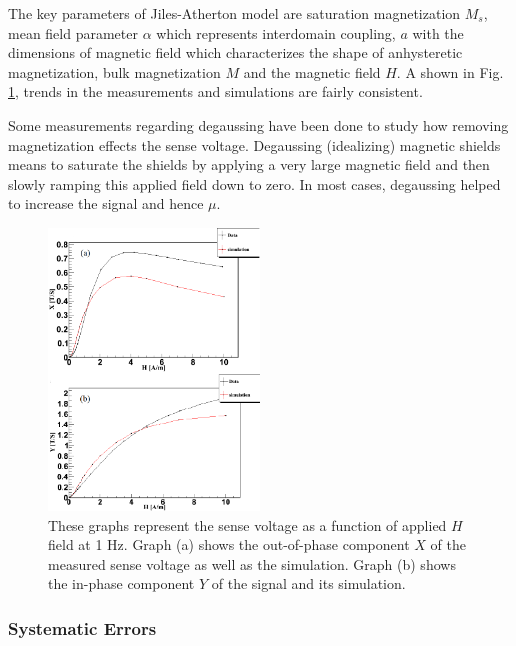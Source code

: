\documentclass[review]{elsarticle}
\begin{document}
The key parameters of Jiles-Atherton model are saturation
magnetization $M_s$, mean field parameter $\alpha$ which represents
interdomain coupling, $a$ with the dimensions of magnetic field which
characterizes the shape of anhysteretic magnetization, bulk
magnetization $M$ and the magnetic field $H$. A shown in
Fig. \ref{fig:data_and_simulation}, trends in the measurements and
simulations are fairly consistent.

Some measurements regarding degaussing have been done to study how
removing magnetization effects the sense voltage. Degaussing
(idealizing) magnetic shields means to saturate the shields by
applying a very large magnetic field and then slowly ramping this
applied field down to zero. In most cases, degaussing helped to
increase the signal and hence $\mu$.

\begin{figure}[h!]
\begin{center}
   \includegraphics[width=0.5\textwidth]{data_and_simulation3.PNG}
    \caption{These graphs represent the sense voltage as a function of applied $H$ field at 1 Hz. Graph (a) shows the out-of-phase component $X$ of the measured sense voltage as well as the simulation. Graph (b) shows the in-phase component $Y$ of the signal and its simulation.}
    \label{fig:data_and_simulation}
    \end{center}
\end{figure} 

\subsubsection{Systematic Errors}

%
\end{document}
